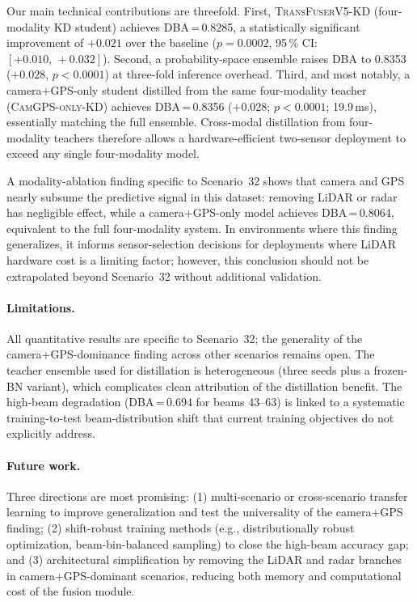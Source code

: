 \documentclass[journal,10pt,twoside]{IEEEtran}
\newcommand{\distill}{\textsc{TransFuserV5-KD}}
\begin{document}
Our main technical contributions are threefold. First, \distill{} (four-modality
KD student) achieves DBA\,=\,0.8285, a statistically significant improvement of
$+0.021$ over the baseline ($p = 0.0002$, 95\,\% CI: $[+0.010,\,+0.032]$).
Second, a probability-space ensemble raises DBA to 0.8353 ($+0.028$,
$p < 0.0001$) at three-fold inference overhead. Third, and most notably, a camera+GPS-only student distilled from the same four-modality
teacher (\textsc{CamGPS-only-KD}) achieves DBA\,=\,0.8356
($+0.028$; $p < 0.0001$; 19.9\,ms), essentially matching the full ensemble.
Cross-modal distillation from four-modality teachers therefore allows a
hardware-efficient two-sensor deployment to exceed any single four-modality model.

A modality-ablation finding specific to Scenario~32 shows that camera and
GPS nearly subsume the predictive signal in this dataset: removing LiDAR or
radar has negligible effect, while a camera+GPS-only model achieves
DBA\,=\,0.8064, equivalent to the full four-modality system. In environments
where this finding generalizes, it informs sensor-selection decisions for
deployments where LiDAR hardware cost is a limiting factor; however, this
conclusion should not be extrapolated beyond Scenario~32 without additional
validation.

\paragraph{Limitations.}
All quantitative results are specific to Scenario~32; the generality of the
camera+GPS-dominance finding across other scenarios remains open.
The teacher ensemble used for distillation is heterogeneous (three seeds
plus a frozen-BN variant), which complicates clean attribution of the
distillation benefit.
The high-beam degradation (DBA\,=\,0.694 for beams 43--63) is linked to a
systematic training-to-test beam-distribution shift that current training
objectives do not explicitly address.

\paragraph{Future work.}
Three directions are most promising:
(1) multi-scenario or cross-scenario transfer learning to improve generalization
    and test the universality of the camera+GPS finding;
(2) shift-robust training methods (e.g., distributionally robust optimization,
    beam-bin-balanced sampling) to close the high-beam accuracy gap; and
(3) architectural simplification by removing the LiDAR and radar branches in
    camera+GPS-dominant scenarios, reducing both memory and computational cost
    of the fusion module.



\end{document}
